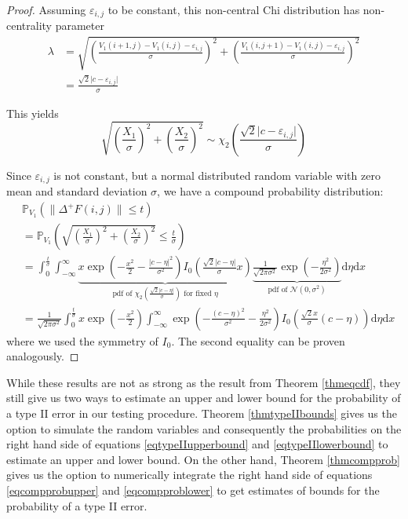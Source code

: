 \documentclass[a4paper,12pt]{article}
\newcommand{\abs}[1]{\lvert#1\rvert}
\newcommand{\norm}[1]{\lVert#1\rVert}
\theoremstyle{plain}
\theoremstyle{definition}
\begin{document}
\begin{proof}
	Assuming $\varepsilon_{i, j}$ to be constant, this non-central Chi distribution has non-centrality parameter
	\begin{align*}
		\lambda &= \sqrt{\left( \frac{V_1(i + 1, j) - V_1(i, j) - \varepsilon_{i, j}}{\sigma} \right)^2 + \left( \frac{V_1(i, j + 1) - V_1(i, j) - \varepsilon_{i, j}}{\sigma} \right)^2} \\
		&= \frac{\sqrt{2} \abs{c - \varepsilon_{i, j}}}{\sigma}
	\end{align*}
	
	This yields
	\begin{equation*}
		\sqrt{\left( \frac{X_1}{\sigma} \right)^2 + \left( \frac{X_2}{\sigma} \right)^2} \sim \chi_2 \left( \frac{\sqrt{2} \abs{c - \varepsilon_{i, j}}}{\sigma} \right)
	\end{equation*}
	
	Since $\varepsilon_{i, j}$ is not constant, but a normal distributed random variable with zero mean and standard deviation $\sigma$, we have a compound probability distribution:
	\begin{align*}
		&\mathbb{P}_{V_1}( \norm{\Delta^+ F(i, j)} \leq t ) \\
		&= \mathbb{P}_{V_1}\left( \sqrt{\left( \frac{X_1}{\sigma} \right)^2 + \left( \frac{X_2}{\sigma} \right)^2} \leq \frac{t}{\sigma} \right) \\
		&= \int_0^\frac{t}{\sigma} \int_{-\infty}^\infty \underbrace{x \exp \left( - \frac{x^2}{2} - \frac{\abs{c - \eta}^2}{\sigma^2} \right) I_0 \left( \frac{\sqrt{2} \abs{c - \eta}}{\sigma} x \right)}_{\textrm{pdf of } \chi_2 \left( \frac{\sqrt{2} \abs{c - \eta}}{\sigma} \right) \textrm{ for fixed } \eta} \underbrace{\frac{1}{\sqrt{2 \pi \sigma^2}} \exp \left( - \frac{\eta^2}{2 \sigma^2} \right)}_{\textrm{pdf of } \mathcal{N}(0, \sigma^2)} \mathrm{d}\eta \mathrm{d}x \\
		&= \frac{1}{\sqrt{2 \pi \sigma^2}} \int_0^\frac{t}{\sigma} x \exp \left( - \frac{x^2}{2} \right) \int_{-\infty}^\infty \exp \left( - \frac{(c - \eta)^2}{\sigma^2} - \frac{\eta^2}{2 \sigma^2} \right) I_0 \left( \frac{\sqrt{2} x}{\sigma} (c - \eta) \right) \mathrm{d}\eta \mathrm{d}x
	\end{align*}
	where we used the symmetry of $I_0$. The second equality can be proven analogously.
\end{proof}

While these results are not as strong as the result from Theorem \ref{thmeqcdf}, they still give us two ways to estimate an upper and lower bound for the probability of a type II error in our testing procedure. Theorem \ref{thmtypeIIbounds} gives us the option to simulate the random variables and consequently the probabilities on the right hand side of equations \eqref{eqtypeIIupperbound} and \eqref{eqtypeIIlowerbound} to estimate an upper and lower bound. On the other hand, Theorem \ref{thmcompprob} gives us the option to numerically integrate the right hand side of equations \eqref{eqcompprobupper} and \eqref{eqcompproblower} to get estimates of bounds for the probability of a type II error.
\end{document}
